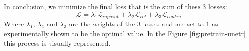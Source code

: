 In conclusion, we minimize the final loss that is the sum of these 3 losses:
$$
\mathcal{L} = \lambda_1\mathcal{L}_{inpaint} + \lambda_2\mathcal{L}_{rot} + \lambda_3\mathcal{L}_{contra}
$$
Where $\lambda_1$, $\lambda_2$ and $\lambda_3$ are the weights of the 3 losses
and are set to $1$ as experimentally shown to be the optimal value. In the
Figure \ref{fig:pretrain-unetr} this process is visually represented.
